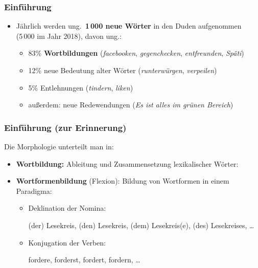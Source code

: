 \begin{frame}
\frametitle{Einführung}

%

\begin{itemize}
\item Jährlich werden ung.\ \textbf{1\,000 neue Wörter} in den Duden aufgenommen \\
(5\,000 im Jahr 2018), davon ung.:

\begin{itemize}
	\item 83\% \textbf{Wortbildungen} (\zB \emph{facebooken}, \emph{gegenchecken}, \emph{entfreunden}, \emph{Späti})
	\item 12\% neue Bedeutung alter Wörter (\zB \emph{runterwürgen}, \emph{verpeilen})
	\item 5\% Entlehnungen (\zB \emph{tindern}, \emph{liken})
	\item außerdem: neue Redewendungen (\zB \emph{Es ist alles im grünen Bereich})
\end{itemize}

\end{itemize}

\end{frame}


\begin{frame}
\frametitle{Einführung (zur Erinnerung)}

Die Morphologie unterteilt man in:
	
	\begin{itemize}
		\item \textbf{Wortbildung:} Ableitung und Zusammensetzung lexikalischer Wörter:
		
		\eal 
		\zl
		
		\item \textbf{Wortformenbildung} (Flexion): Bildung von Wortformen in einem Paradigma: 
		
		\begin{itemize}
			\item Deklination der Nomina: 
			
			\ea (der) Lesekreis, (den) Lesekreis, (dem) Lesekreis(e), (des) Lesekreises, \ldots
			\z 
			
			\item Konjugation der Verben: 
			
			\ea fordere, forderst, fordert, fordern, \ldots 
			\z 
		\end{itemize}	
	\end{itemize}	

\end{frame}


